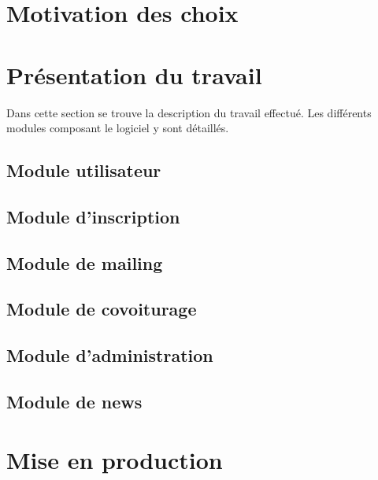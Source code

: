 \documentclass[12pt, a4paper, oneside]{article}
\begin{document}
\section{Motivation des choix}
\section{Présentation du travail}
    Dans cette section se trouve la description du travail effectué. Les différents modules composant le logiciel y sont détaillés.
\subsection{Module utilisateur}
\subsection{Module d'inscription}
\subsection{Module de mailing}
\subsection{Module de covoiturage}
\subsection{Module d'administration}
\subsection{Module de news}
\section{Mise en production}
\end{document}
